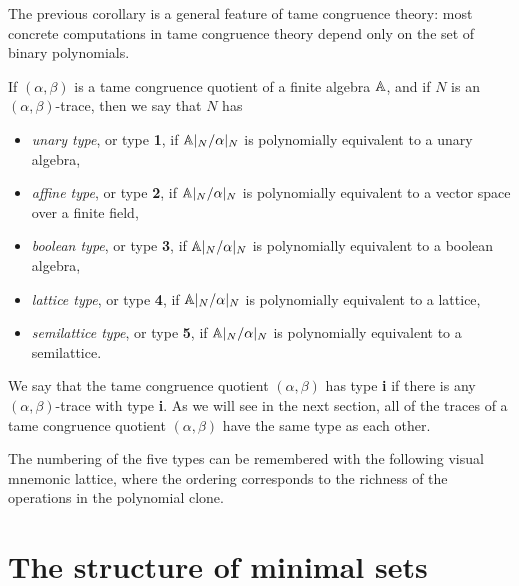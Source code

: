 \begin{appendices}
The previous corollary is a general feature of tame congruence theory: most concrete computations in tame congruence theory depend only on the set of binary polynomials.

\begin{defn} If $(\alpha,\beta)$ is a tame congruence quotient of a finite algebra $\mathbb{A}$, and if $N$ is an $(\alpha,\beta)$-trace, then we say that $N$ has
\begin{itemize}
\item \emph{unary type}, or type \textbf{1}, if $\mathbb{A}|_N/\alpha|_N$ is polynomially equivalent to a unary algebra,
\item \emph{affine type}, or type \textbf{2}, if $\mathbb{A}|_N/\alpha|_N$ is polynomially equivalent to a vector space over a finite field,
\item \emph{boolean type}, or type \textbf{3}, if $\mathbb{A}|_N/\alpha|_N$ is polynomially equivalent to a boolean algebra,
\item \emph{lattice type}, or type \textbf{4}, if $\mathbb{A}|_N/\alpha|_N$ is polynomially equivalent to a lattice,
\item \emph{semilattice type}, or type \textbf{5}, if $\mathbb{A}|_N/\alpha|_N$ is polynomially equivalent to a semilattice.
\end{itemize}
We say that the tame congruence quotient $(\alpha,\beta)$ has type \textbf{i} if there is any $(\alpha,\beta)$-trace with type \textbf{i}. As we will see in the next section, all of the traces of a tame congruence quotient $(\alpha,\beta)$ have the same type as each other.
\end{defn}

The numbering of the five types can be remembered with the following visual mnemonic lattice, where the ordering corresponds to the richness of the operations in the polynomial clone.

\begin{center}
\end{center}


\section{The structure of minimal sets}


\end{appendices}
